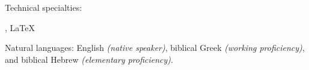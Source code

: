 
\inlineheadsection %
{Technical specialties:}
{ , \LaTeX

}


\inlineheadsection %
{Natural languages:}
{English \textit{(native speaker)}, biblical Greek \textit{(working proficiency)}, and biblical Hebrew \textit{(elementary proficiency)}.}


